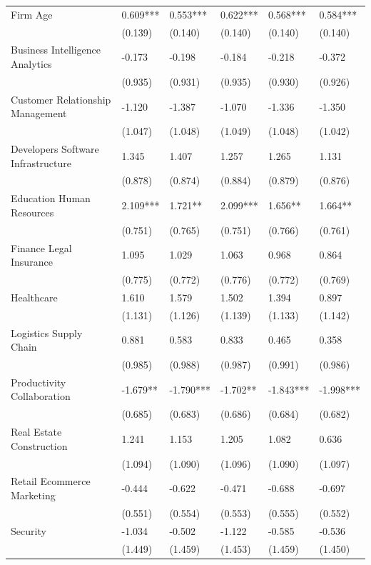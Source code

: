 \documentclass[12pt]{article}
\begin{document}
\begin{table}[!ht]
\begin{tabular}{llllll}
        Firm Age & 0.609*** & 0.553*** & 0.622*** & 0.568*** & 0.584*** \\
        ~ & (0.139) & (0.140) & (0.140) & (0.140) & (0.140) \\
        Business Intelligence Analytics & -0.173 & -0.198 & -0.184 & -0.218 & -0.372 \\
        ~ & (0.935) & (0.931) & (0.935) & (0.930) & (0.926) \\
        Customer Relationship Management & -1.120 & -1.387 & -1.070 & -1.336 & -1.350 \\
        ~ & (1.047) & (1.048) & (1.049) & (1.048) & (1.042) \\
        Developers Software Infrastructure & 1.345 & 1.407 & 1.257 & 1.265 & 1.131 \\
        ~ & (0.878) & (0.874) & (0.884) & (0.879) & (0.876) \\
        Education Human Resources & 2.109*** & 1.721** & 2.099*** & 1.656** & 1.664** \\
        ~ & (0.751) & (0.765) & (0.751) & (0.766) & (0.761) \\
        Finance Legal Insurance & 1.095 & 1.029 & 1.063 & 0.968 & 0.864 \\
        ~ & (0.775) & (0.772) & (0.776) & (0.772) & (0.769) \\
        Healthcare & 1.610 & 1.579 & 1.502 & 1.394 & 0.897 \\
        ~ & (1.131) & (1.126) & (1.139) & (1.133) & (1.142) \\
        Logistics Supply Chain & 0.881 & 0.583 & 0.833 & 0.465 & 0.358 \\
        ~ & (0.985) & (0.988) & (0.987) & (0.991) & (0.986) \\
        Productivity Collaboration & -1.679** & -1.790*** & -1.702** & -1.843*** & -1.998*** \\
        ~ & (0.685) & (0.683) & (0.686) & (0.684) & (0.682) \\
        Real Estate Construction & 1.241 & 1.153 & 1.205 & 1.082 & 0.636 \\
        ~ & (1.094) & (1.090) & (1.096) & (1.090) & (1.097) \\
        Retail Ecommerce Marketing & -0.444 & -0.622 & -0.471 & -0.688 & -0.697 \\
        ~ & (0.551) & (0.554) & (0.553) & (0.555) & (0.552) \\
        Security & -1.034 & -0.502 & -1.122 & -0.585 & -0.536 \\
        ~ & (1.449) & (1.459) & (1.453) & (1.459) & (1.450) \\

\end{tabular}
\end{table}
\end{document}
